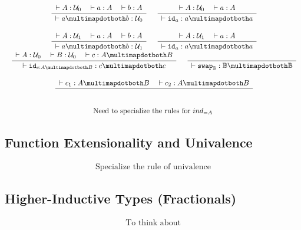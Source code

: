 \documentclass[format=acmlarge,review,natbib]{acmart}
\newcommand{\idc}{\mathtt{id}}
\newcommand{\swapc}{\mathtt{swap}}
\newcommand{\iso}{\multimapdotboth}
\newcommand{\boolt}{\mathbb{B}}
\newcommand{\uzero}{\mathcal{U}_0}
\newcommand{\uone}{\mathcal{U}_1}
\newcommand{\Rule}[2]{
\makebox{
$\displaystyle
\frac{\begin{array}{l}#1\\\end{array}}
{\begin{array}{l}#2\\\end{array}}$}}
\newcommand{\proves}{\vdash}
\newcommand{\jdg}[3]{#1 \proves #2 : #3}
\begin{document}
\[\begin{array}{c}
\Rule{\jdg{}{A}{\uzero}
         \quad\jdg{}{a}{A}
         \quad\jdg{}{b}{A}}
        {\jdg{}{a \iso b}{\uzero}}
\quad
\Rule{\jdg{}{A}{\uzero}
          \quad\jdg{}{a}{A}}
         {\jdg{}{\idc_{a}}{a \iso a}}
\\
\\
\Rule{\jdg{}{A}{\uone}
         \quad\jdg{}{a}{A}
         \quad\jdg{}{b}{A}}
        {\jdg{}{a \iso b}{\uone}}
\quad
\Rule{\jdg{}{A}{\uone}
          \quad\jdg{}{a}{A}}
         {\jdg{}{\idc_{a}}{a \iso a}}
\\
\Rule{\jdg{}{A}{\uzero}
         \quad\jdg{}{B}{\uzero}
         \quad\jdg{}{c}{A \iso B}}
         {\jdg{}{\idc_{c:A\iso B}}{c \iso c}}
\quad
\Rule{}{\jdg{}{\swapc_{\boolt}}{\boolt\iso\boolt}}
\\
\\
\Rule{\jdg{}{c_1}{A \iso B}
         \quad\jdg{}{c_2}{A \iso B}}
         {}
\\
\\
\mbox{Need to specialize the rules for } ind_{=A}
\end{array}\]

\subsection{Function Extensionality and Univalence}

\[\begin{array}{c}
\mbox{Specialize the rule of univalence}
\end{array}\]

\subsection{Higher-Inductive Types (Fractionals)}

\[\begin{array}{c}
\mbox{To think about}
\end{array}\]


{\footnotesize

}
\end{document}
